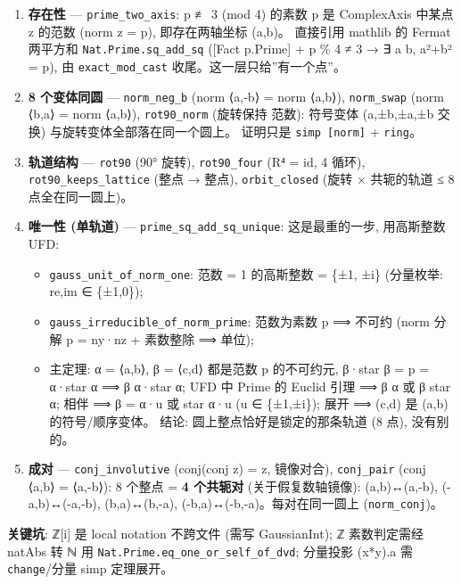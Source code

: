 \documentclass[
]{article}
\providecommand{\tightlist}{%
  \setlength{\itemsep}{0pt}\setlength{\parskip}{0pt}}
\begin{document}
\begin{enumerate}
\def\labelenumi{\arabic{enumi}.}
\tightlist
\item
  \textbf{存在性} --- \texttt{prime\_two\_axis}: p ≢ 3 (mod 4) 的素数 p
  是 ComplexAxis 中某点 z 的范数 (norm z = p), 即存在两轴坐标 (a,b)。
  直接引用 mathlib 的 Fermat 两平方和 \texttt{Nat.Prime.sq\_add\_sq}
  ({[}Fact p.Prime{]} + p \% 4 ≠ 3 → ∃ a b, a²+b² = p), 由
  \texttt{exact\_mod\_cast} 收尾。这一层只给''有一个点''。
\item
  \textbf{8 个变体同圆} --- \texttt{norm\_neg\_b} (norm ⟨a,-b⟩ = norm
  ⟨a,b⟩), \texttt{norm\_swap} (norm ⟨b,a⟩ = norm ⟨a,b⟩),
  \texttt{rot90\_norm} (旋转保持 范数): 符号变体 (a,±b,±a,±b 交换)
  与旋转变体全部落在同一个圆上。 证明只是 \texttt{simp\ {[}norm{]}} +
  \texttt{ring}。
\item
  \textbf{轨道结构} --- \texttt{rot90} (90° 旋转), \texttt{rot90\_four}
  (R⁴ = id, 4 循环), \texttt{rot90\_keeps\_lattice} (整点 → 整点),
  \texttt{orbit\_closed} (旋转 × 共轭的轨道 ≤ 8 点全在同一圆上)。
\item
  \textbf{唯一性 (单轨道)} --- \texttt{prime\_sq\_add\_sq\_unique}:
  这是最重的一步, 用高斯整数 UFD:

  \begin{itemize}
  \tightlist
  \item
    \texttt{gauss\_unit\_of\_norm\_one}: 范数 = 1 的高斯整数 = \{±1,
    ±i\} (分量枚举: re,im ∈ \{±1,0\});
  \item
    \texttt{gauss\_irreducible\_of\_norm\_prime}: 范数为素数 p ⟹ 不可约
    (norm 分解 p = ny·nz + 素数整除 ⟹ 单位);
  \item
    主定理: α = ⟨a,b⟩, β = ⟨c,d⟩ 都是范数 p 的不可约元, β·star β = p =
    α·star α ⟹ β \textbar{} α·star α; UFD 中 Prime 的 Euclid 引理 ⟹ β
    \textbar{} α 或 β \textbar{} star α; 相伴 ⟹ β = α·u 或 star α·u (u ∈
    \{±1,±i\}); 展开 ⟹ (c,d) 是 (a,b) 的符号/顺序变体。 结论:
    圆上整点恰好是锁定的那条轨道 (8 点), 没有别的。
  \end{itemize}
\item
  \textbf{成对} --- \texttt{conj\_involutive} (conj(conj z) = z,
  镜像对合), \texttt{conj\_pair} (conj ⟨a,b⟩ = ⟨a,-b⟩): 8 个整点 =
  \textbf{4 个共轭对} (关于假复数轴镜像): (a,b)↔(a,-b), (-a,b)↔(-a,-b),
  (b,a)↔(b,-a), (-b,a)↔(-b,-a)。每对在同一圆上 (\texttt{norm\_conj})。
\end{enumerate}

\textbf{关键坑}: ℤ{[}i{]} 是 local notation 不跨文件 (需写 GaussianInt);
ℤ 素数判定需经 natAbs 转 ℕ 用
\texttt{Nat.Prime.eq\_one\_or\_self\_of\_dvd}; 分量投影 (x*y).a 需
\texttt{change}/分量 simp 定理展开。
\end{document}
